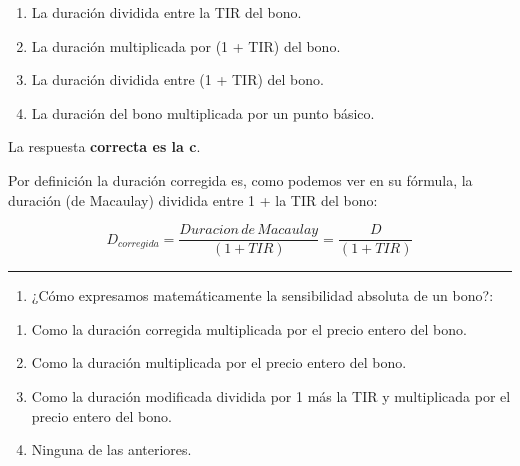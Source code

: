 \documentclass[
  letterpaper,
  DIV=11,
  numbers=noendperiod]{scrartcl}
\providecommand{\tightlist}{%
  \setlength{\itemsep}{0pt}\setlength{\parskip}{0pt}}\usepackage{longtable,booktabs,array}
\begin{document}
\begin{enumerate}
\def\labelenumi{\alph{enumi}.}
\item
  La duración dividida entre la TIR del bono.
\item
  La duración multiplicada por (1 + TIR) del bono.
\item
  La duración dividida entre (1 + TIR) del bono.
\item
  La duración del bono multiplicada por un punto básico.
\end{enumerate}

\begin{tcolorbox}[enhanced jigsaw, colframe=quarto-callout-note-color-frame, opacityback=0, colback=white, leftrule=.75mm, left=2mm, breakable, arc=.35mm, rightrule=.15mm, toprule=.15mm, bottomrule=.15mm]
\begin{minipage}[t]{5.5mm}
\textcolor{quarto-callout-note-color}{\faInfo}
\end{minipage}%
\begin{minipage}[t]{\textwidth - 5.5mm}

La respuesta \textbf{correcta es la c}.

Por definición la duración corregida es, como podemos ver en su fórmula,
la duración (de Macaulay) dividida entre 1 + la TIR del bono:

\[D_{corregida}=\frac{Duracion\,de\, Macaulay}{\left(1+TIR\right)}=\frac{D}{\left(1+TIR\right)} \]

\end{minipage}%
\end{tcolorbox}

\begin{center}\rule{0.5\linewidth}{0.5pt}\end{center}

\begin{enumerate}
\def\labelenumi{\arabic{enumi}.}
\setcounter{enumi}{18}
\tightlist
\item
  ¿Cómo expresamos matemáticamente la sensibilidad absoluta de un bono?:
\end{enumerate}

\begin{enumerate}
\def\labelenumi{\alph{enumi}.}
\item
  Como la duración corregida multiplicada por el precio entero del bono.
\item
  Como la duración multiplicada por el precio entero del bono.
\item
  Como la duración modificada dividida por 1 más la TIR y multiplicada
  por el precio entero del bono.
\item
  Ninguna de las anteriores.
\end{enumerate}
\end{document}
